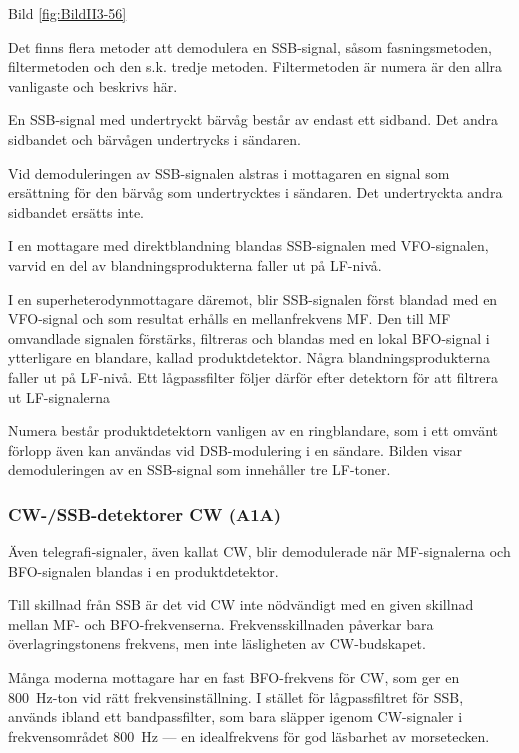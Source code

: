 Bild \ref{fig:BildII3-56}

Det finns flera metoder att demodulera en SSB-signal, såsom
fasningsmetoden, filtermetoden och den s.k. tredje
metoden. Filtermetoden är numera är den allra vanligaste och beskrivs
här.

En SSB-signal med undertryckt bärvåg består av endast ett sidband. Det
andra sidbandet och bärvågen undertrycks i sändaren.

Vid demoduleringen av SSB-signalen alstras i mottagaren en signal som
ersättning för den bärvåg som undertrycktes i sändaren. Det
undertryckta andra sidbandet ersätts inte.

I en mottagare med direktblandning blandas SSB-signalen med
VFO-signalen, varvid en del av blandningsprodukterna faller ut på
LF-nivå.

I en superheterodynmottagare däremot, blir SSB-signalen först blandad
med en VFO-signal och som resultat erhålls en mellanfrekvens MF. Den
till MF omvandlade signalen förstärks, filtreras och blandas med en
lokal BFO-signal i ytterligare en blandare, kallad
produktdetektor. Några blandningsprodukterna faller ut på LF-nivå. Ett
lågpassfilter följer därför efter detektorn för att filtrera ut
LF-signalerna

Numera består produktdetektorn vanligen av en ringblandare, som i ett
omvänt förlopp även kan användas vid DSB-modulering i en
sändare. Bilden visar demoduleringen av en SSB-signal som innehåller
tre LF-toner.

\subsubsection{CW-/SSB-detektorer CW (A1A)}

Även telegrafi-signaler, även kallat CW, blir demodulerade när
MF-signalerna och BFO-signalen blandas i en produktdetektor.

Till skillnad från SSB är det vid CW inte nödvändigt med en given
skillnad mellan MF- och BFO-frekvenserna. Frekvensskillnaden påverkar
bara överlagringstonens frekvens, men inte läsligheten av
CW-budskapet.

Många moderna mottagare har en fast BFO-frekvens för CW, som ger en
800~Hz-ton vid rätt frekvensinställning. I stället för lågpassfiltret
för SSB, används ibland ett bandpassfilter, som bara släpper igenom
CW-signaler i frekvensområdet 800~Hz --- en idealfrekvens för god
läsbarhet av morsetecken.

